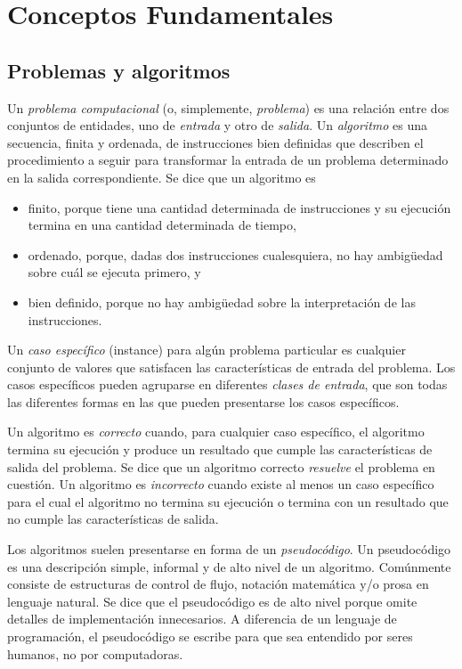 
\chapter{Conceptos Fundamentales}

\section{Problemas y algoritmos}

Un \emph{problema computacional} (o, simplemente, \emph{problema})
es una relación entre dos conjuntos de entidades, uno de \emph{entrada}
y otro de \emph{salida}. Un \emph{algoritmo} es una secuencia, finita
y ordenada, de instrucciones bien definidas que describen el procedimiento
a seguir para transformar la entrada de un problema determinado en
la salida correspondiente. Se dice que un algoritmo es
\begin{itemize}
\item finito, porque tiene una cantidad determinada de instrucciones y su
ejecución termina en una cantidad determinada de tiempo,
\item ordenado, porque, dadas dos instrucciones cualesquiera, no hay ambigüedad
sobre cuál se ejecuta primero, y
\item bien definido, porque no hay ambigüedad sobre la interpretación de
las instrucciones.
\end{itemize}
Un \emph{caso específico} (instance) para algún problema particular
es cualquier conjunto de valores que satisfacen las características
de entrada del problema. Los casos específicos pueden agruparse en
diferentes \emph{clases de entrada}, que son todas las diferentes
formas en las que pueden presentarse los casos específicos.

Un algoritmo es \emph{correcto} cuando, para cualquier caso específico,
el algoritmo termina su ejecución y produce un resultado que cumple
las características de salida del problema. Se dice que un algoritmo
correcto \emph{resuelve} el problema en cuestión. Un algoritmo es
\emph{incorrecto} cuando existe al menos un caso específico para el
cual el algoritmo no termina su ejecución o termina con un resultado
que no cumple las características de salida. 

Los algoritmos suelen presentarse en forma de un \emph{pseudocódigo}.
Un pseudocódigo es una descripción simple, informal y de alto nivel
de un algoritmo. Comúnmente consiste de estructuras de control de
flujo, notación matemática y/o prosa en lenguaje natural. Se dice
que el pseudocódigo es de alto nivel porque omite detalles de implementación
innecesarios. A diferencia de un lenguaje de programación, el pseudocódigo
se escribe para que sea entendido por seres humanos, no por computadoras.

